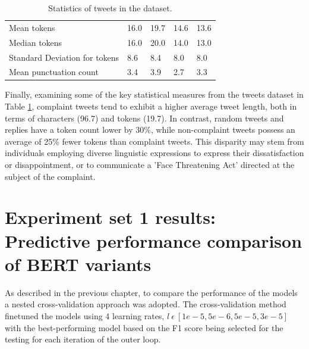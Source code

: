 \begin{table}[htbp]
\begin{tabularx}{\textwidth}{|l|X|X|X|X|}
        Mean tokens                     & 16.0                & 19.7                & 14.6                    & 13.6            \\
        \rowcolor[gray]{0.9}
        Median tokens                   & 16.0                & 20.0                & 14.0                    & 13.0            \\
        Standard Deviation for tokens   & 8.6                 & 8.4                 & 8.0                     & 8.0             \\
        \hline
        \hline
        Mean punctuation count          & 3.4                 & 3.9                 & 2.7                     & 3.3             \\
        \hline
    \end{tabularx}
    \caption{Statistics of tweets in the dataset.}
    \label{tab: tweets_statistics}
\end{table}

Finally, examining some of the key statistical measures from the tweets dataset in Table \ref{tab: tweets_statistics}, complaint tweets tend to exhibit a higher average tweet length, both in terms of characters (96.7) and tokens (19.7). In contrast, random tweets and replies have a token count lower by 30\%, while non-complaint tweets possess an average of 25\% fewer tokens than complaint tweets. This disparity may stem from individuals employing diverse linguistic expressions to express their dissatisfaction or disappointment, or to communicate a 'Face Threatening Act' directed at the subject of the complaint.

\section{Experiment set 1 results: Predictive performance comparison of BERT variants}
As described in the previous chapter, to compare the performance of the models a nested cross-validation approach was adopted. The cross-validation method finetuned the models using 4 learning rates, $l\:\epsilon\:[1e-5, 5e-6, 5e-5, 3e-5]$ with the best-performing model based on the F1 score being selected for the testing for each iteration of the outer loop. \\

